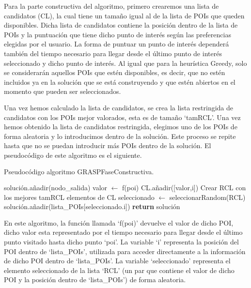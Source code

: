 \vspace{0.06in}
Para la parte constructiva del algoritmo, primero crearemos una lista de candidatos (CL), la cual tiene un tamaño igual al de la lista de POIs que queden disponibles. Dicha lista de candidatos contiene la posición dentro de la lista de POIs y la puntuación que tiene dicho punto de interés según las preferencias elegidas por el usuario. La forma de puntuar un punto de interés dependerá también del tiempo necesario para llegar desde el último punto de interés seleccionado y dicho punto de interés. Al igual que para la heurística Greedy, solo se considerarán aquellos POIs que estén disponibles, es decir, que no estén incluidos ya en la solución que se está construyendo y que estén abiertos en el momento que pueden ser seleccionados.\newline

Una vez hemos calculado la lista de candidatos, se crea la lista restringida de candidatos con los POIs mejor valorados, esta es de tamaño \enquote*{tamRCL}. Una vez hemos obtenido la lista de candidatos restringida, elegimos uno de los POIs de forma aleatoria y lo introducimos dentro de la solución. Este proceso se repite hasta que no se puedan introducir más POIs dentro de la solución. El pseudocódigo de este algoritmo es el siguiente.\newline

\vspace{0.06in}
\begin{algorithm}
	\caption{Pseudocódigo algoritmo GRASPFaseConstructiva.}
	\label{alg:grasp_contruct}
	\begin{algorithmic}
		\State solución.añadir(nodo\_salida)
				\State valor $\gets$ f(poi)
				\State CL.añadir([valor,i])
			\EndFor
			\State Crear RCL con los mejores tamRCL elementos de CL
			\State seleccionado $\gets$ seleccionarRandom(RCL)
			\State solución.añadir(lista\_POIs[seleccionado.i])
		\EndWhile
		\State \textbf{return} solución
		\EndFunction
	\end{algorithmic}
\end{algorithm}
\vspace{0.06in}

En este algoritmo, la función llamada \enquote*{f(poi)} devuelve el valor de dicho POI, dicho valor esta representado por el tiempo necesario para llegar desde el último punto visitado hasta dicho punto \enquote*{poi}. La variable \enquote*{i} representa la posición del POI dentro de \enquote*{lista\_POIs}, utilizada para acceder directamente a la información de dicho POI dentro de \enquote*{lista\_POIs}. La variable \enquote*{seleccionado} representa el elemento seleccionado de la lista \enquote*{RCL} (un par que contiene el valor de dicho POI y la posición dentro de \enquote*{lista\_POIs}) de forma aleatoria.\newline

